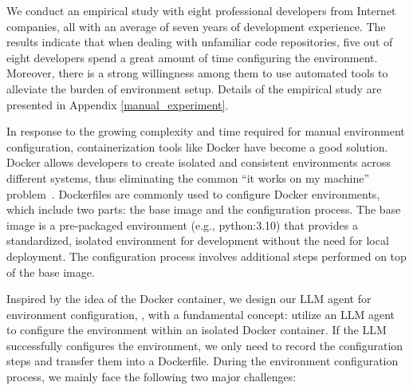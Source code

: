 We conduct an empirical study with eight professional developers from Internet companies, all with an average of seven years of development experience. The results indicate that when dealing with unfamiliar code repositories, five out of eight developers spend a great amount of time configuring the environment. Moreover, there is a strong willingness among them to use automated tools to alleviate the burden of environment setup. Details of the empirical study are presented in Appendix \ref{manual_experiment}.

In response to the growing complexity and time required for manual environment configuration, containerization tools like Docker have become a good solution. Docker allows developers to create isolated and consistent environments across different systems, thus eliminating the common ``it works on my machine'' problem~\cite{valstar2020using}. Dockerfiles are commonly used to configure Docker environments, which include two parts: the base image and the configuration process. The base image is a pre-packaged environment (e.g., python:3.10) that provides a standardized, isolated environment for development without the need for local deployment. The configuration process involves additional steps performed on top of the base image.



Inspired by the idea of the Docker container, we design our LLM agent for environment configuration, \tool, with a fundamental concept: utilize an LLM agent to configure the environment within an isolated Docker container. If the LLM successfully configures the environment, we only need to record the configuration steps and transfer them into a Dockerfile.
During the environment configuration process, we mainly face the following two major challenges:

